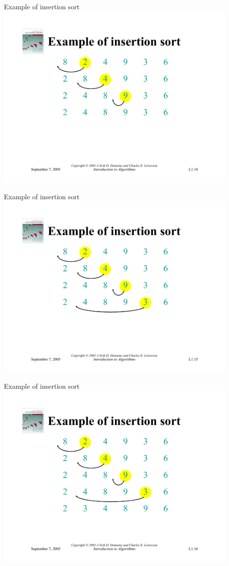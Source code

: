 \documentclass{beamer}
\begin{document}
\begin{frame}{Example of insertion sort}
    \centering
    \includegraphics[width=0.9\textwidth, trim={5cm 2.95cm 5cm 4.25cm}, clip]{pages/lec1_14}
\end{frame}
\begin{frame}{Example of insertion sort}
    \centering
    \includegraphics[width=0.9\textwidth, trim={5cm 2.95cm 5cm 4.25cm}, clip]{pages/lec1_15}
\end{frame}
\begin{frame}{Example of insertion sort}
    \centering
    \includegraphics[width=0.9\textwidth, trim={5cm 2.95cm 5cm 4.25cm}, clip]{pages/lec1_16}
\end{frame}
\end{document}
